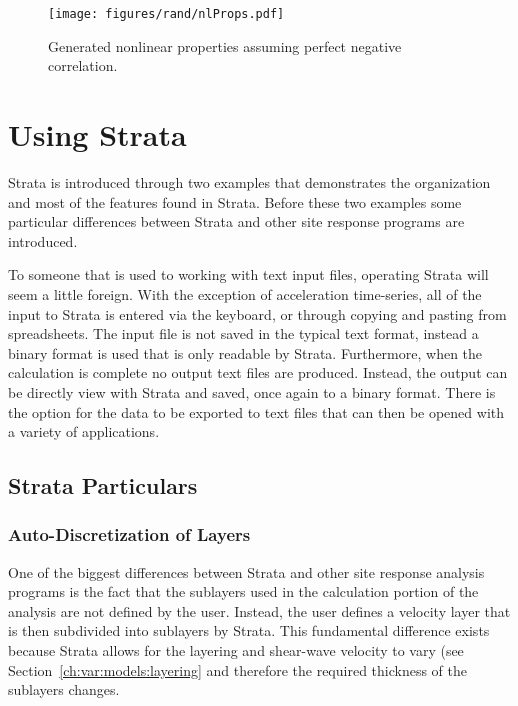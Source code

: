 \documentclass[12pt,oneside]{book}
\begin{document}
\begin{figure}[tp]
    \begin{center}
        \texttt{[image: figures/rand/nlProps.pdf]}
    \end{center}
    \caption{Generated nonlinear properties assuming perfect negative correlation.}
    \label{fig:rand:nlProps}
\end{figure}

\chapter{Using Strata}\label{ch:strata}
Strata is introduced through two examples that demonstrates the organization and most of the
features found in Strata. Before these two examples some particular differences between Strata and
other site response programs are introduced. 

To someone that is used to working with text input files, operating Strata will seem a little
foreign.  With the exception of acceleration time-series, all of the input to Strata is
entered via the keyboard, or through copying and pasting from spreadsheets.  The input file is not
saved in the typical text format, instead a binary format is used that is only readable by Strata.
Furthermore, when the calculation is complete no output text files are produced.  Instead, the
output can be directly view with Strata and saved, once again to a binary format.  There is the
option for the data to be exported to text files that can then be opened with a variety of
applications.

\section{Strata Particulars}
\subsection{Auto-Discretization of Layers}
One of the biggest differences between Strata and other site response analysis programs is the fact
that the sublayers used in the calculation portion of the analysis are not defined by the user.
Instead, the user defines a velocity layer that is then subdivided into sublayers by Strata.  This
fundamental difference exists because Strata allows for the layering and shear-wave velocity to vary
(see Section~\ref{ch:var:models:layering} and therefore the required thickness of the sublayers
changes.
\end{document}
